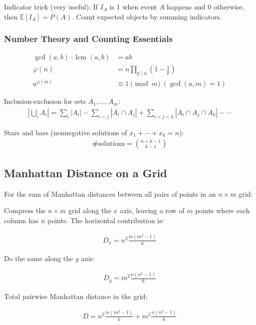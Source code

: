 \documentclass[10pt,letterpaper,landscape,twocolumn]{article}
\begin{document}
Indicator trick (very useful): If $I_A$ is 1 when event $A$ happens and 0 otherwise,
then $\mathbb{E}[I_A]=P(A)$. Count expected objects by summing indicators.

\subsubsection{Number Theory and Counting Essentials}
\begin{align*}
\gcd(a,b)\cdot\operatorname{lcm}(a,b) &= ab \\
\varphi(n) &= n\prod_{p\mid n}\left(1-\frac{1}{p}\right) \\
a^{\varphi(m)} &\equiv 1 \pmod m \ (\gcd(a,m)=1)
\end{align*}

Inclusion-exclusion for sets $A_1,\dots,A_m$:
\begin{align*}
\left|\bigcup_i A_i\right| = \sum_i |A_i| - \sum_{i<j}|A_i\cap A_j| + \sum_{i<j<k}|A_i\cap A_j\cap A_k| - \cdots
\end{align*}

Stars and bars (nonnegative solutions of $x_1+\cdots+x_k=n$):
\begin{align*}
\#\text{solutions} = \binom{n+k-1}{k-1}
\end{align*}

\subsection{Manhattan Distance on a Grid}

For the sum of Manhattan distances between all pairs of points in an $n \times m$ grid:

Compress the $n \times m$ grid along the $x$ axis, leaving a row of $m$ points where each column has $n$ points. The horizontal contribution is:

\begin{align*}
D_x = n^2 \frac{m(m^2 - 1)}{6}
\end{align*}

Do the same along the $y$ axis:

\begin{align*}
D_y = m^2 \frac{n(n^2 - 1)}{6}
\end{align*}

Total pairwise Manhattan distance in the grid:

\begin{align*}
D = n^2 \frac{m(m^2 - 1)}{6} + m^2 \frac{n(n^2 - 1)}{6}
\end{align*}
\end{document}
